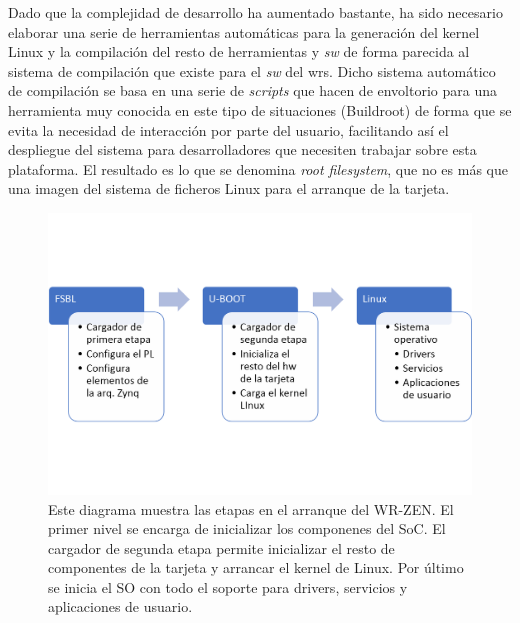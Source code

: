 Dado que la complejidad de desarrollo ha aumentado bastante, ha sido necesario 
elaborar una serie de herramientas automáticas para la generación del kernel 
Linux y la compilación del resto de herramientas y \textit{sw} de forma 
parecida al sistema de compilación que existe para el \textit{sw} del 
\gls{wrs}. Dicho sistema automático de compilación se basa en una serie de 
\textit{scripts} que hacen de envoltorio para una herramienta muy conocida en 
este tipo de situaciones (Buildroot) de forma que se evita la necesidad de 
interacción por parte del usuario, facilitando así el despliegue del sistema 
para desarrolladores que necesiten trabajar sobre esta plataforma. El resultado 
es lo que se denomina \textit{root filesystem}, que no es más que una imagen 
del sistema de ficheros Linux para el arranque de la tarjeta.


\begin{figure}
	\centering
	\includegraphics[width=0.7\linewidth]{imagenes/cargazen}
	\caption[Diagrama de flujo del arranque del WR-ZEN]{Este diagrama muestra 
	las etapas en el arranque del WR-ZEN. El primer nivel se encarga de 
	inicializar los componenes del SoC. El cargador de segunda etapa permite 
	inicializar el resto de componentes de la tarjeta y arrancar el kernel de 
	Linux. Por último se inicia el SO con todo el soporte para drivers, 
	servicios y aplicaciones de usuario.}
	\label{fig:cargazen}
\end{figure}


